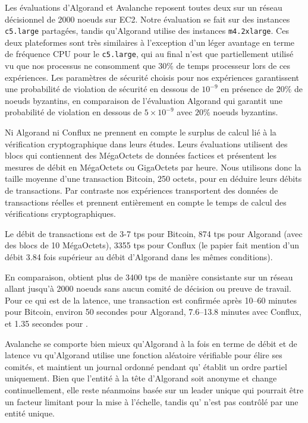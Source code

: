 Les évaluations d'Algorand et Avalanche reposent toutes deux sur un réseau décisionnel de 2000 noeuds sur EC2.
Notre évaluation se fait sur des instances \texttt{c5.large} partagées, tandis qu'Algorand utilise des instances
\texttt{m4.2xlarge}\@. Ces deux plateformes sont très similaires à l'exception d'un léger avantage en terme de
fréquence CPU pour le \texttt{c5.large}, qui au final n'est que partiellement utilisé vu que nos processus ne
consomment que $30\%$ de temps processeur lors de ces expériences. Les paramètres de sécurité choisis pour nos
expériences garantissent une probabilité de violation de sécurité en dessous de $10^{-9}$ en présence de
$20\%$ de noeuds byzantins, en comparaison de l'évaluation Algorand qui garantit une probabilité de violation en dessous
de $5 \times 10^{-9}$ avec $20\%$ noeuds byzantins.

Ni Algorand ni Conflux ne prennent en compte le surplus de calcul lié à la vérification cryptographique dans leurs
études. Leurs évaluations utilisent des blocs qui contiennent des MégaOctets de données factices et présentent les
mesures de débit en MégaOctets ou GigaOctets par heure. Nous utilisons donc la taille moyenne d'une transaction
Bitcoin, 250 octets, pour en déduire leurs débits de transactions. Par contraste nos expériences transportent des
données de transactions réelles et prennent entièrement en compte le temps de calcul des vérifications cryptographiques.

Le débit de transactions est de 3-7 tps pour Bitcoin, 874 tps pour Algorand (avec des blocs de 10 MégaOctets), 3355 tps
pour Conflux (le papier fait mention d'un débit 3.84 fois supérieur au débit d'Algorand dans les mêmes conditions).

En comparaison, {\sysname} obtient plus de 3400 tps de manière consistante sur un réseau allant jusqu'à 2000 noeuds
sans aucun comité de décision ou preuve de travail. Pour ce qui est de la latence, une transaction est confirmée
après 10--60 minutes pour Bitcoin, environ 50 secondes pour Algorand, 7.6--13.8 minutes avec Conflux, et 1.35 secondes
pour {\sysname}.

Avalanche se comporte bien mieux qu'Algorand à la fois en terme de débit et de latence vu qu'Algorand utilise une
fonction aléatoire vérifiable pour élire ses comités, et maintient un journal ordonné pendant qu'{\sysname} établit
un ordre partiel uniquement. Bien que l'entité à la tête d'Algorand soit anonyme et change continuellement, elle reste
néanmoins basée sur un leader unique qui pourrait être un facteur limitant pour la mise à l'échelle, tandis
qu'{\sysname} n'est pas contrôlé par une entité unique.

